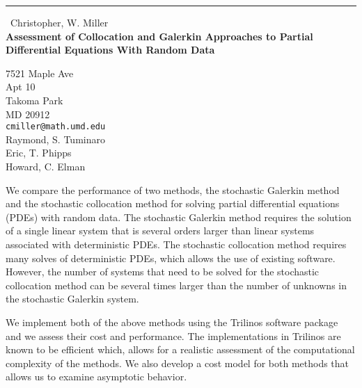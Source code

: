 \documentclass{report}
\begin{document}
\begin{center}
\rule{6in}{1pt} \
{\large Christopher, W. Miller \\
{\bf Assessment of Collocation and Galerkin Approaches to Partial Differential Equations With Random Data}}

7521 Maple Ave \\ Apt 10 \\ Takoma Park \\ MD 20912
\\
{\tt cmiller@math.umd.edu}\\
Raymond, S. Tuminaro\\
Eric, T. Phipps\\
Howard, C. Elman\end{center}

We compare the performance of two methods, the stochastic Galerkin method and
the stochastic collocation method for solving partial differential
equations (PDEs) with random data. The stochastic Galerkin method
requires the solution of a single linear system that is several orders
larger than linear systems associated with deterministic PDEs. The
stochastic collocation method requires many solves of deterministic PDEs,
which allows the use of existing software. However, the number of systems
that need to be solved for the stochastic collocation method can be
several times larger than the number of unknowns in the stochastic
Galerkin system.

We implement both of the above methods using the Trilinos software
package and we assess their cost and performance. The implementations in
Trilinos are known to be efficient which, allows
for a realistic assessment of the computational complexity of the
methods. We also develop a cost model for both methods that allows us to
examine asymptotic behavior.
\end{document}
